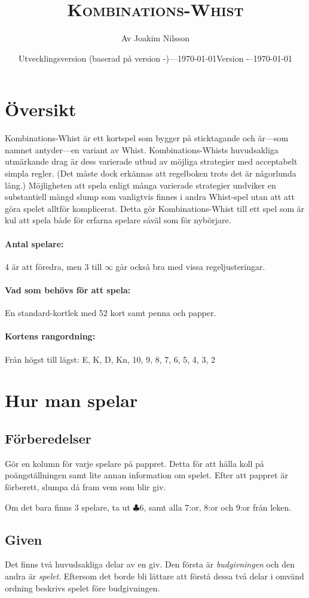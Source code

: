 \documentclass[a4paper]{article}
\title{\textsc{Kombinations-Whist}}
\author{Av Joakim Nilsson}
\date{Utvecklingsversion (baserad på version \varVersion-\varLanguage)---\today}
\date{Version \varVersion-\varLanguage\---\today}
\begin{document}
	\introPages

	\section{Översikt}
		Kombinations-Whist är ett kortspel som bygger på sticktagande och är---som namnet antyder---en variant av Whist. Kombinations-Whists huvudsakliga utmärkande drag är dess varierade utbud av möjliga strategier med acceptabelt simpla regler. (Det måste dock erkännas att regelboken trots det är någorlunda lång.) Möjligheten att spela enligt många varierade strategier undviker en substantiell mängd slump som vanligtvis finnes i andra Whist-spel utan att att göra spelet alltför komplicerat. Detta gör Kombinations-Whist till ett spel som är kul att spela både för erfarna spelare såväl som för nybörjare.

		\paragraph{Antal spelare:}
		4 är att föredra, men 3 till $\infty$ går också bra med vissa regeljusteringar.

		\paragraph{Vad som behövs för att spela:}
		En standard-kortlek med 52 kort samt penna och papper.

		\paragraph{Kortens rangordning:}
		Från högst till lägst: E, K, D, Kn, 10, 9, 8, 7, 6, 5, 4, 3, 2

	\section{Hur man spelar}
		\subsection{Förberedelser}
			Gör en kolumn för varje spelare på pappret. Detta för att hålla koll på poängställningen samt lite annan information om spelet. Efter att pappret är förberett, slumpa då fram vem som blir giv.

			Om det bara finns 3 spelare, ta ut $\clubsuit 6$, samt alla 7:or, 8:or och 9:or från leken.

		\subsection{Given}
			Det finns två huvudsakliga delar av en giv. Den första är \emph{budgivningen} och den andra är \emph{spelet}. Eftersom det borde bli lättare att förstå dessa två delar i omvänd ordning beskrivs spelet före budgivningen.
\end{document}

